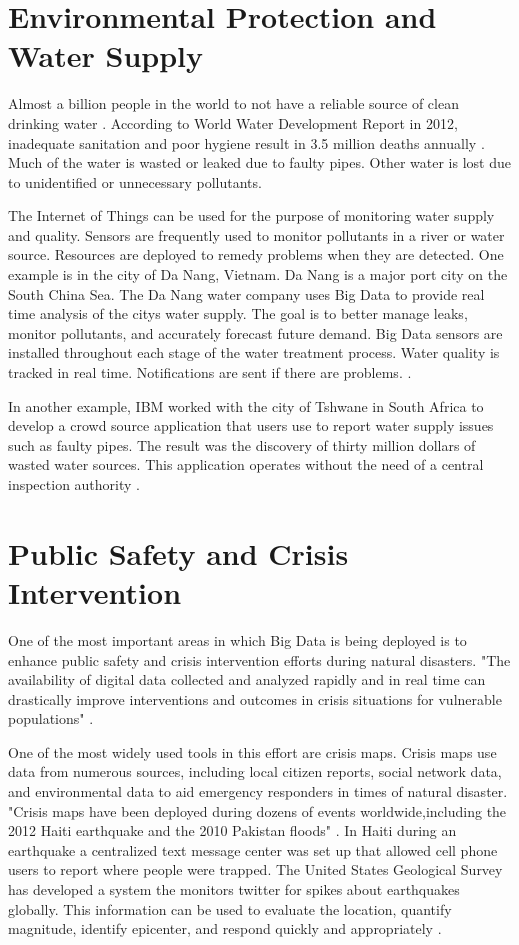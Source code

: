 \documentclass[sigconf]{acmart}
\begin{document}
\section{Environmental Protection and Water Supply}

Almost a billion people in the world to not have a reliable source of clean drinking water \cite{www-google-top10}. According to World Water Development Report in 2012, inadequate sanitation and poor hygiene result in 3.5 million deaths annually \cite{DevEcon}. Much of the water is wasted or leaked due to faulty pipes. Other water is lost due to unidentified or unnecessary pollutants.

The Internet of Things can be used for the purpose of monitoring water supply and quality. Sensors are frequently used to monitor pollutants in a river or water source. Resources are deployed to remedy problems when they are detected.  One example is in the city of Da Nang, Vietnam. Da Nang is a major port city on the South China Sea. The Da Nang water company uses Big Data to provide real time analysis of the citys water supply. The goal is to better manage leaks, monitor pollutants, and accurately forecast future demand. Big Data sensors are installed throughout each stage of the water treatment process. Water quality is tracked in real time. Notifications are sent if there are problems. \cite{DevEcon}.

In another example, IBM worked with the city of Tshwane in South Africa to develop a crowd source application that users use to report water supply issues such as faulty pipes. The result was the discovery of thirty million dollars of wasted water sources. This application operates without the need of a central inspection authority \cite{www-google-Hffpst}.

\section{Public Safety and Crisis Intervention}

One of the most important areas in which Big Data is being deployed is to enhance public safety and crisis intervention efforts during natural disasters. "The availability of digital data collected and analyzed rapidly and in real time can drastically improve interventions and outcomes in crisis situations for vulnerable populations" \cite{www-google-GloPls}.  

One of the most widely used tools in this effort are crisis maps. Crisis maps use data from numerous sources, including local citizen reports, social network data, and environmental data to aid emergency responders in times of natural disaster. "Crisis maps have been deployed during dozens of events worldwide,including the 2012 Haiti earthquake and the 2010 Pakistan floods" \cite{www-google-Hffpst}.
In Haiti during an earthquake a centralized text message center was set up that allowed cell phone users to report where people were trapped. The United States Geological Survey has developed a system the monitors twitter for spikes about earthquakes globally. This information can be used to evaluate the location, quantify magnitude, identify epicenter, and respond quickly and appropriately \cite{www-google-GloPls}.
\end{document}

